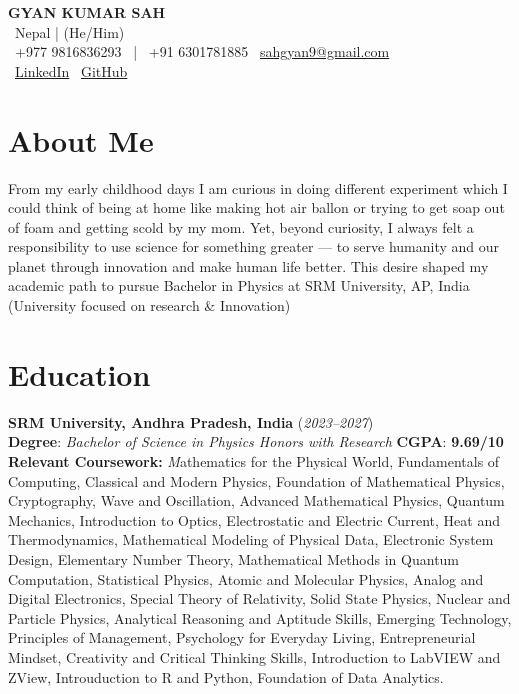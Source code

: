 \documentclass[a4paper,10pt]{article}
\begin{document}
\begin{center}
    {\LARGE \textbf{GYAN KUMAR SAH}} \\
    \vspace{2pt}
    {\small \faMapMarker \ Nepal \quad | \quad (He/Him)} \\
    \vspace{4pt}
    {\small 
    \faPhone \ +977 9816836293 \ | \ +91 6301781885 \quad 
    \faEnvelope \ \href{mailto:sahgyan9@gmail.com}{sahgyan9@gmail.com}
    } \\
    \vspace{2pt}
    {\small 
    \faLinkedin \ \href{https://www.linkedin.com/in/gyan-sah-a4705b291}{LinkedIn} \quad 
    \faGithub \ \href{https://github.com/sahgyan9}{GitHub}
    }
\end{center}

\section*{About Me}
From my early childhood days I am curious in doing different experiment which I could think of being at home like making hot air ballon or trying to get soap out of foam and getting scold by my mom. Yet, beyond curiosity, I always
felt a responsibility to use science for something greater — to serve humanity and our planet
through innovation and make human life better. This desire shaped my academic path to pursue Bachelor in Physics at SRM University, AP, India (University focused on research \& Innovation)


\section*{Education}

\textbf{SRM University, Andhra Pradesh, India}  (\textit{2023–2027}) \\
\textbf{Degree}: \textit{Bachelor of Science in Physics Honors with Research}          \hfill     \textbf{CGPA}: \textbf{9.69/10} \\
\textbf{Relevant Coursework:} \textit   Mathematics for the Physical World, Fundamentals of Computing, Classical and Modern Physics, Foundation of Mathematical Physics,  Cryptography, Wave and Oscillation, Advanced Mathematical Physics, Quantum Mechanics, Introduction to Optics,  Electrostatic and Electric Current, Heat and Thermodynamics, Mathematical Modeling of Physical Data, Electronic System Design, Elementary Number Theory, Mathematical Methods in Quantum Computation, Statistical Physics, Atomic and Molecular Physics, Analog and Digital Electronics, Special Theory of Relativity, Solid State Physics, Nuclear and Particle Physics, Analytical Reasoning and Aptitude Skills, Emerging Technology, Principles of Management, Psychology for Everyday Living, Entrepreneurial Mindset, Creativity and Critical Thinking Skills, Introduction to LabVIEW and ZView, Introuduction to R and Python, Foundation of Data Analytics. 
\end{document}
